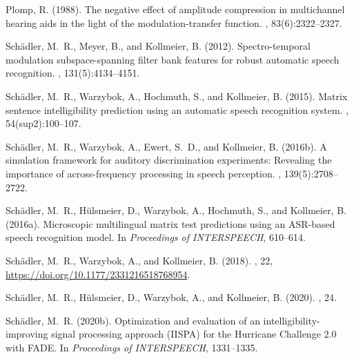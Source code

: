 \documentclass[10pt,a4paper,twocolumn]{article}
\begin{document}
\begin{thebibliography}{}
	Plomp, R. (1988).
	\newblock The negative effect of amplitude compression in multichannel hearing aids in the light of the modulation-transfer function.
	, 83(6):2322--2327.

	Schädler, M.~R., Meyer, B., and Kollmeier, B. (2012).
	\newblock Spectro-temporal modulation subspace-spanning filter bank features for robust automatic speech recognition.
	,
	131(5):4134--4151.
	
	Schädler, M.~R., Warzybok, A., Hochmuth, S., and Kollmeier, B. (2015).
	\newblock Matrix sentence intelligibility prediction using an automatic speech
	recognition system.
	, 54(sup2):100--107.
	
	Schädler, M.~R., Warzybok, A., Ewert, S.~D., and Kollmeier, B. (2016b).
	\newblock A simulation framework for auditory discrimination experiments:
	Revealing the importance of across-frequency processing in speech perception.
	,
	139(5):2708--2722.
	
	Schädler, M.~R., Hülsmeier, D., Warzybok, A., Hochmuth, S., and Kollmeier, B.
	(2016a).
	\newblock Microscopic multilingual matrix test predictions using an ASR-based
	speech recognition model.
	\newblock In {\em Proceedings of INTERSPEECH}, 610--614.
	
	Schädler, M.~R., Warzybok, A., and Kollmeier, B. (2018).
	, 22, \url{https://doi.org/10.1177/2331216518768954}.
		
	Schädler, M.~R., Hülsmeier, D., Warzybok, A., and Kollmeier, B. (2020).
	, 24.
	
	Schädler, M.~R. (2020b).
	\newblock Optimization and evaluation of an intelligibility-improving signal processing approach (IISPA) for the Hurricane Challenge 2.0 with FADE.
	\newblock In {\em Proceedings of INTERSPEECH}, 1331--1335.
  

\end{thebibliography}
\end{document}
